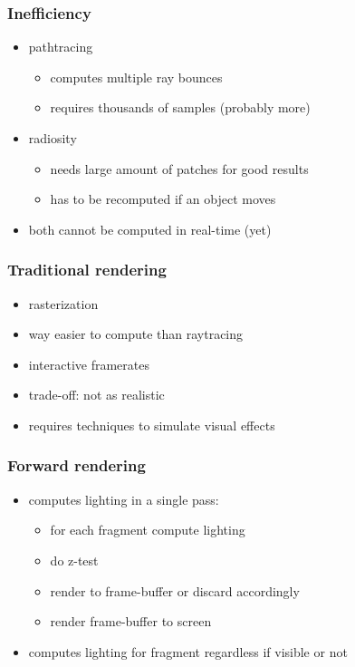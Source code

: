\documentclass{beamer}
\begin{document}
	\begin{frame}
		\frametitle{Inefficiency}
		\begin{itemize}
			\item pathtracing 
				\begin{itemize}
					\item computes multiple ray bounces
					\item requires thousands of samples (probably more) 
				\end{itemize}
			\item radiosity
				\begin{itemize}
					\item needs large amount of patches for good results
					\item has to be recomputed if an object moves
				\end{itemize}
			\item both cannot be computed in real-time (yet)
		\end{itemize}
	\end{frame}

	\begin{frame}
		\frametitle{Traditional rendering}
		\begin{itemize}
			\item rasterization
			\item way easier to compute than raytracing
			\item interactive framerates
			\item trade-off: not as realistic
			\item requires techniques to simulate visual effects
		\end{itemize}
	\end{frame}

	\begin{frame}
		\frametitle{Forward rendering}
		\begin{itemize}
			\item computes lighting in a single pass:
				\begin{itemize}
					\item for each fragment compute lighting
					\item do z-test
					\item render to frame-buffer or discard accordingly
					\item render frame-buffer to screen
				\end{itemize}
			\item computes lighting for fragment regardless if visible or not
		\end{itemize}
	\end{frame}
\end{document}
